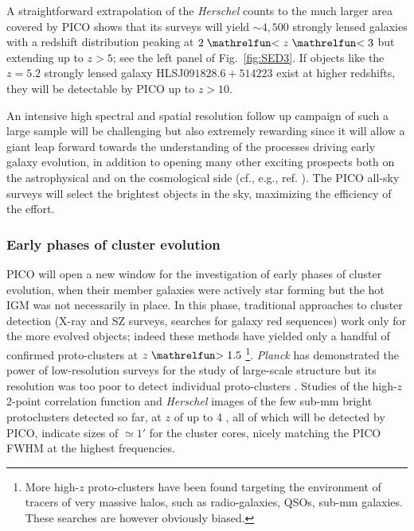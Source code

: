 \documentclass[PICOReport.tex]{subfiles}
\begin{document}
A straightforward extrapolation of the \textit{Herschel} counts to the much larger area covered by PICO shows that its surveys will yield $\sim 4,500$ strongly lensed galaxies with a redshift distribution peaking at $2\simlt z \simlt 3$ \cite{Negrello2017lensed} but extending up to $z> 5$; see the left panel of Fig.~\ref{fig:SED3}. If objects like the $z=5.2$ strongly lensed galaxy HLSJ$091828.6+514223$ exist at higher redshifts, they will be detectable by PICO up to $z>10$.

An intensive high spectral and spatial resolution follow up campaign of such a large sample will be challenging but also extremely rewarding since it will allow a giant leap forward towards the understanding of the processes driving early galaxy evolution, in addition to opening many other exciting prospects both on the astrophysical and on the cosmological side (cf., e.g., ref. \cite{Treu2010}). The PICO all-sky surveys will select the brightest objects in the sky, maximizing the efficiency of the effort.

\subsubsection{Early phases of cluster evolution}

PICO will open a new window for the investigation of early phases of cluster evolution, when their member galaxies were actively star forming but the hot IGM was not necessarily in place. In this phase, traditional approaches to cluster detection (X-ray and SZ surveys, searches for galaxy red sequences) work only for the more evolved objects; indeed these methods have yielded only a handful of confirmed proto-clusters at $z\simgt 1.5$ \cite{Overzier2016}\footnote{More high-$z$ proto-clusters have been found targeting the environment of tracers of very massive halos, such as radio-galaxies, QSOs, sub-mm galaxies. These searches are however obviously biased.}.
\textit{Planck} has demonstrated the power of low-resolution surveys for the study of large-scale structure  \cite{Planck2016high_z} but its resolution was too poor to detect individual proto-clusters \cite{Negrello2017protocl}.  Studies of the high-$z$ 2-point correlation function \cite{Chen2016, Negrello2017protocl} and \textit{Herschel} images of the few sub-mm bright protoclusters detected so far, at $z$ of up to 4 \cite{Ivison2013, Wang2016, Oteo2018}, all of which will be detected by PICO, indicate sizes of $\simeq 1'$ for the cluster cores, nicely matching the PICO FWHM at the highest frequencies.
\end{document}
